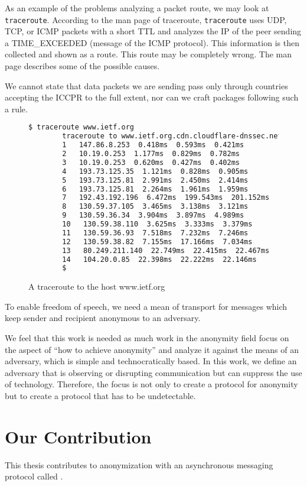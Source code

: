 As an example of the problems analyzing a packet route, we may look at \verb|traceroute|. According to the man page of traceroute, \verb|traceroute| uses UDP, TCP, or ICMP packets with a short TTL and analyzes the IP of the peer sending a TIME\_EXCEEDED (message of the ICMP protocol). This information is then collected and shown as a route. This route may be completely wrong. The man page describes some of the possible causes.

We cannot state that data packets we are sending pass only through countries accepting the ICCPR to the full extent, nor can we craft packages following such a rule.

\begin{figure}[H]
	\begin{lstlisting}[language=bash,breaklines=true,basicstyle=\tiny]
		$ traceroute www.ietf.org
		traceroute to www.ietf.org.cdn.cloudflare-dnssec.net (104.20.0.85), 64 hops max
		1   147.86.8.253  0.418ms  0.593ms  0.421ms
		2   10.19.0.253  1.177ms  0.829ms  0.782ms
		3   10.19.0.253  0.620ms  0.427ms  0.402ms
		4   193.73.125.35  1.121ms  0.828ms  0.905ms
		5   193.73.125.81  2.991ms  2.450ms  2.414ms
		6   193.73.125.81  2.264ms  1.961ms  1.959ms
		7   192.43.192.196  6.472ms  199.543ms  201.152ms
		8   130.59.37.105  3.465ms  3.138ms  3.121ms
		9   130.59.36.34  3.904ms  3.897ms  4.989ms
		10   130.59.38.110  3.625ms  3.333ms  3.379ms
		11   130.59.36.93  7.518ms  7.232ms  7.246ms
		12   130.59.38.82  7.155ms  17.166ms  7.034ms
		13   80.249.211.140  22.749ms  22.415ms  22.467ms
		14   104.20.0.85  22.398ms  22.222ms  22.146ms
		$
	\end{lstlisting}
	\caption{A traceroute to the host www.ietf.org}
\end{figure}

To enable freedom of speech, we need a mean of transport for messages which keep sender and recipient anonymous to an adversary.

We feel that this work is needed as much work in the anonymity field focus on the aspect of ``how to achieve anonymity'' and analyze it against the means of an adversary, which is simple and technocratically based. In this work, we define an adversary that is observing or disrupting communication but can suppress the use of technology. Therefore, the focus is not only to create a protocol for anonymity but to create a protocol that has to be undetectable.

\chapter{Our Contribution}
This thesis contributes to anonymization with an asynchronous messaging protocol called \MessageVortex.

